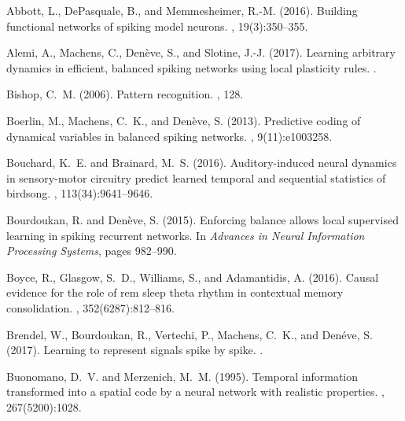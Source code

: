 \documentclass[11pt]{article} %
\begin{document}
\begin{thebibliography}{10}

Abbott, L., DePasquale, B., and Memmesheimer, R.-M. (2016).
\newblock Building functional networks of spiking model neurons.
, 19(3):350--355.

Alemi, A., Machens, C., Den{\`e}ve, S., and Slotine, J.-J. (2017).
\newblock Learning arbitrary dynamics in efficient, balanced spiking networks
  using local plasticity rules.
.

Bishop, C.~M. (2006).
\newblock Pattern recognition.
, 128.

Boerlin, M., Machens, C.~K., and Den{\`e}ve, S. (2013).
\newblock Predictive coding of dynamical variables in balanced spiking
  networks.
, 9(11):e1003258.

Bouchard, K.~E. and Brainard, M.~S. (2016).
\newblock Auditory-induced neural dynamics in sensory-motor circuitry predict
  learned temporal and sequential statistics of birdsong.
,
  113(34):9641--9646.

Bourdoukan, R. and Den{\`e}ve, S. (2015).
\newblock Enforcing balance allows local supervised learning in spiking
  recurrent networks.
\newblock In {\em Advances in Neural Information Processing Systems}, pages
  982--990.

Boyce, R., Glasgow, S.~D., Williams, S., and Adamantidis, A. (2016).
\newblock Causal evidence for the role of rem sleep theta rhythm in contextual
  memory consolidation.
, 352(6287):812--816.

Brendel, W., Bourdoukan, R., Vertechi, P., Machens, C.~K., and Den{\'e}ve, S.
  (2017).
\newblock Learning to represent signals spike by spike.
.

Buonomano, D.~V. and Merzenich, M.~M. (1995).
\newblock Temporal information transformed into a spatial code by a neural
  network with realistic properties.
, 267(5200):1028.


\end{thebibliography}
\end{document}
